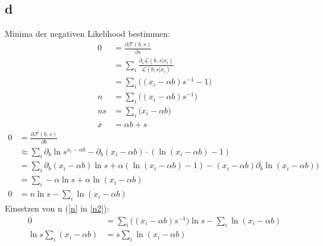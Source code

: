 \subsection*{d}
Minima der negativen Likelihood bestimmen:
\begin{align}
0 &=\frac{\partial\mathcal{F}(b,s)}{\partial s} \\
&= \sum_i \frac{\partial_s\mathcal{L}(b,s|x_i)}{\mathcal{L}(b,s|x_i)}\\
&= \sum_i\biggl((x_i-\alpha b)s^{-1}-1\biggr)\\
n&= \sum_i\biggl((x_i-\alpha b)s^{-1}\biggr)\label{n}\\
ns&= \sum_i\biggl(x_i-\alpha b\biggr)\\
\overline{x}&= \alpha b +s
\end{align}
\begin{align}
0 &=\frac{\partial\mathcal{F}(b,s)}{\partial b} \\
&\approx \sum_i \partial_b \ln s^{x_i-\alpha b} - \partial_b (x_i-\alpha b)\cdot(\ln(x_i-\alpha b)-1)\\
&= \sum_i \partial_b (x_i-\alpha b)\ln s + \alpha (\ln(x_i-\alpha b)-1) - (x_i-\alpha b)\partial_b\ln(x_i-\alpha b))\\
&= \sum_i -\alpha\ln s + \alpha \ln(x_i-\alpha b)\\
0&= n \ln s - \sum_i \ln(x_i-\alpha b)\label{n2}
\end{align}
Einsstzen von n (\ref{n} in \ref{n2}):
\begin{align}
0&= \sum_i\biggl((x_i-\alpha b)s^{-1}\biggr) \ln s - \sum_i \ln(x_i-\alpha b)\\
\ln s\sum_i(x_i-\alpha b)  &= s\sum_i \ln(x_i-\alpha b)
\end{align}
